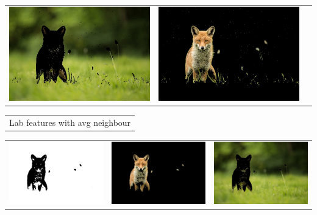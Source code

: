 \documentclass{article}
\begin{document}
\begin{center}
\begin{tabular}{c c c}
 \includegraphics[width=.37\linewidth]{../image-segmentation/output/add-Lab-neighbor-diff-feature/fox_seg1.jpg} & \includegraphics[width=.37\linewidth]{../image-segmentation/output/add-Lab-neighbor-diff-feature/fox_seg2.jpg} \\
  
 \end{tabular}
 \begin{tabular}{c}

Lab features with avg neighbour \\
\end{tabular}
 \begin{tabular}{c c c} 

 \includegraphics[width=.37\linewidth]{../image-segmentation/output/add-Lab-neighbor-avg-feature/fox_mask.jpg} & 
 
 \includegraphics[width=.37\linewidth]{../image-segmentation/output/add-Lab-neighbor-avg-feature/fox_seg1.jpg} & \includegraphics[width=.37\linewidth]{../image-segmentation/output/add-Lab-neighbor-avg-feature/fox_seg2.jpg} \\
  
 \end{tabular}
 
 
\end{center}
\end{document}
